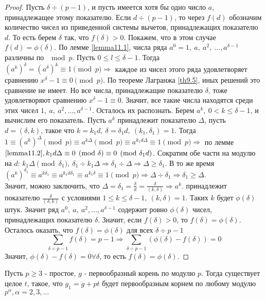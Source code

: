     \begin{proof}
        Пусть $\delta \div (p-1)$, и пусть имеется хотя бы одно число $a$, принадлежащее этому показателю. Если $d\div (p-1)$, то через $f(d)$ обозначим количество чисел из приведенной системы вычетов, принадлежащих показателю $d$. То есть берем $\delta$ так, что $f(\delta)>0$. Покажем, что в этом случае $f(d)=\phi(\delta)$. По лемме \ref{lemma11.1}, числа ряда $a^0=1,\ a,\ a^2,\ \dots, a^{\delta-1}$ различны по $\mod{p}$. Пусть $0\leq l\leq \delta-1$. Тогда $(a^k)^{\delta}=(a^{\delta})^k\equiv 1\pmod{p} \Rightarrow$ каждое из чисел этого ряда удовлетворяет сравнению $x^{\delta}-1\equiv 0\pmod{p}$. По теореме Лагранжа \eqref{th9.5}, иных решений это сравнение не имеет. Но все числа, принадлежащие показателю $\delta$, тоже удовлетворяют сравнению $x^{\delta}-1\equiv 0$. Значит, все такие числа находятся среди этих чисел $1,\ a,\ a^2, \dots, a^{\delta-1}$. Осталось их распознать. Берем $a^k,\ 0<k\leq \delta-1$, и вычислим его показатель. Пусть $a^k$ принадлежит показателю $\Delta$, пусть $d=(\delta,k)$, такое что $k=k_1 d,\ \delta=\delta_1 d,\ (k_1, \delta_1)=1$. Тогда $1\equiv (a^k)^{\Delta} \pmod{p}\equiv a^{k\Delta}\pmod{p}\equiv a^{k_1d\Delta}\equiv 1\pmod{p} \Rightarrow $ по лемме $\ref{lemma11.2}, k_1d\Delta\equiv 0\pmod{\delta}\equiv 0\pmod{\delta_1 d}$. Сократим обе части на модулю на $d$: $k_1\Delta\pmod{\delta_1},\ \delta_1 \div k_1\Delta \Rightarrow \delta_1 \div \Delta \Rightarrow \Delta \geq \delta_1$. В то же время \\
        $(a^k)^{\delta_1}\equiv a^{k\delta_1}\equiv a^{k_1 d\delta_1}\equiv a^{k_1\delta}\equiv 1\pmod{p} \Rightarrow \Delta \div \delta_1 \Rightarrow \delta_1\geq \Delta$.\\
        Значит, можно заключить, что $\Delta=\delta_1=\frac{\delta}{d}=\frac{\delta}{(k,\delta)} \Rightarrow a^k$. принадлежит показателю $\frac{\delta}{(\delta, k)}$ с условиями $1\leq k \leq \delta-1,\ (k,\delta)=1$. Таких $k$ будет $\phi(\delta)$ штук. Значит ряд $a^0,\ a,\ a^2, \dots, a^{\delta-1}$ содержит ровно $\phi(\delta)$ чисел, принадлежащих показателю $\delta$. Значит, если $f(\delta)>0$, то $f(\delta)=\phi(\delta)$. Осталось оказать, что $f(\delta)=\phi(\delta)$ для всех $\delta \div p-1$
        \[\sum\limits_{\delta \div p-1}f(\delta)=p-1 \Rightarrow \sum\limits_{\delta \div p-1}(\phi(\delta)-f(\delta))=0\]
        Значит, $\phi(\delta)-f(\delta)=0 \forall \delta$, то есть $f(\delta)=\phi(\delta)$.
    \end{proof}
    \begin{theorem}\label{th11.2}
        Пусть $p\geq 3$ - простое, $g$ - первообразный корень по модулю $p$. Тогда существует целое $t$, такое, что $g_1=g+pt$ будет первообразным корнем по любому модулю $p^{\alpha}, \alpha=2,3,\dots$
    \end{theorem} 
